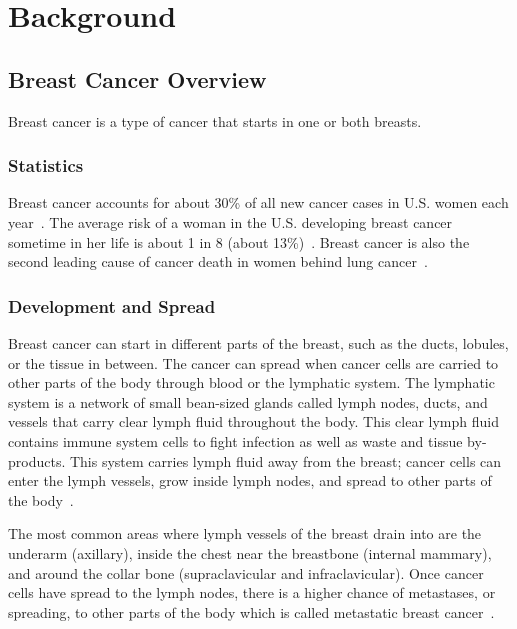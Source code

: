 \section{Background\label{introduction:background}}

\subsection{Breast Cancer Overview\label{sec:introduction:breastcanceroverview}}
Breast cancer is a type of cancer that starts in one or both breasts.

\subsubsection{Statistics\label{sec:introduction:breastcancer:statistics}}
Breast cancer accounts for about 30\% of all new cancer cases in U.S. women each year~\cite{RefWorks:RefID:150-2025breast}. The average risk of a woman in the U.S. developing breast cancer sometime in her life is about 1 in 8 (about 13\%)~\cite{RefWorks:RefID:36-american2021breast}. Breast cancer is also the second leading cause of cancer death in women behind lung cancer~\cite{RefWorks:RefID:36-american2021breast}.

\subsubsection{Development and Spread\label{sec:introduction:breastcancer:developmentandspread}}
Breast cancer can start in different parts of the breast, such as the ducts, lobules, or the tissue in between. The cancer can spread when cancer cells are carried to other parts of the body through blood or the lymphatic system. The lymphatic system is a network of small bean-sized glands called lymph nodes, ducts, and vessels that carry clear lymph fluid throughout the body. This clear lymph fluid contains immune system cells to fight infection as well as waste and tissue by-products. This system carries lymph fluid away from the breast; cancer cells can enter the lymph vessels, grow inside lymph nodes, and spread to other parts of the body~\cite{RefWorks:RefID:36-american2021breast}.

The most common areas where lymph vessels of the breast drain into are the underarm (axillary), inside the chest near the breastbone (internal mammary), and around the collar bone (supraclavicular and infraclavicular). Once cancer cells have spread to  the lymph nodes, there is a higher chance of metastases, or spreading, to other parts of the body which is called metastatic breast cancer~\cite{RefWorks:RefID:36-american2021breast}.

